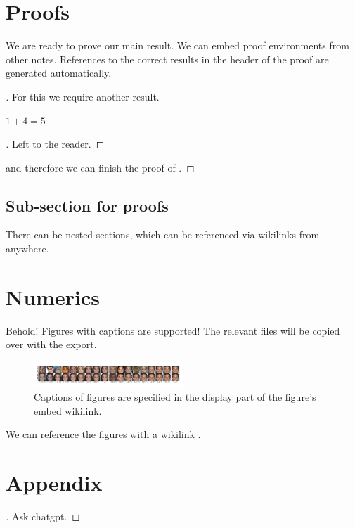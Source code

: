 \documentclass{article}
\begin{document}
\section{Proofs}
\label{loc:body.proofs}
We are ready to prove our main result. We can embed proof environments from other notes. References to the correct results in the header of the proof are generated automatically.
\begin{proof}[\hypertarget{loc:theorem_1.proof}Proof of \Cref{loc:theorem_1.statement}]

For this we require another result.
\begin{proposition}
\label{loc:lemma_2.statement}
$1+4 = 5$
\end{proposition}
\begin{proof}[\hypertarget{loc:lemma_2.proof}Proof of \Cref{loc:lemma_2.statement}]

Left to the reader.
\end{proof}
and therefore we can finish the proof of .
\end{proof}
\subsection{Sub-section for proofs}
\label{loc:body.proofs.sub:section_for_proofs}
There can be nested sections, which can be referenced via wikilinks from anywhere.
\section{Numerics}
\label{loc:body.numerics}
Behold! Figures with captions are supported! The relevant files will be copied over with the export.
\begin{figure}[h]
\centering
\includegraphics[width=0.5\textwidth]{Files/intro_comp_wlabel.pdf}
\caption{Captions of figures are specified in the display part of the figure's embed wikilink.\label{fig:intro_comp_wlabel.pdf}}
\end{figure}
We can reference the figures with a wikilink .
\printbibliography
\appendix
\section{Appendix}
\begin{proof}[\hypertarget{loc:lemma_1.proof}Proof of \Cref{loc:lemma_1.statement}]

Ask chatgpt.
\end{proof}
\end{document}
